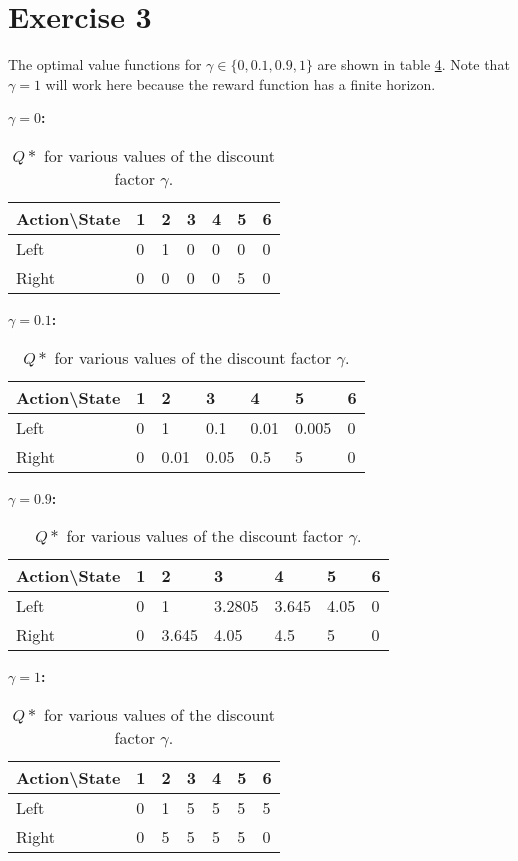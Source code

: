 \documentclass [a4paper] {report}
\begin{document}
	
	\section*{Exercise 3}
	The optimal value functions for $\gamma \in \{ 0,0.1, 0.9, 1 \}$ are shown in table \ref{optQs}.
	Note that $\gamma=1$ will work here because the reward function has a finite horizon.
	
	\begin{table}[H]
		\centering
		\caption{$Q*$ for various values of the discount factor $\gamma$.}
		\label{optQs}
		\textbf{$\gamma=0$:}
		\begin{tabular}{l|llllll}
			Action\textbackslash State    & 1 & 2 & 3 & 4 & 5 & 6 \\ \hline
			Left 				& 0 & 1 & 0 & 0 & 0 & 0 \\ 
			Right 			& 0 & 0 & 0 & 0 & 5 & 0 \\ 
		\end{tabular}
		
		\textbf{$\gamma=0.1$:}
		\begin{tabular}{l|llllll}
			Action\textbackslash State    & 1 & 2 & 3 & 4 & 5 & 6 \\ \hline
			Left 				& 0 & 1 & 0.1 & 0.01 & 0.005 & 0 \\ 
			Right 			& 0 & 0.01 & 0.05 & 0.5 & 5 & 0 \\ 
		\end{tabular}
		
		\textbf{$\gamma=0.9$:}
		\begin{tabular}{l|llllll}
			Action\textbackslash State    & 1 & 2 & 3 & 4 & 5 & 6 \\ \hline
			Left 				& 0 & 1 & 3.2805 & 3.645 & 4.05 & 0 \\ 
			Right 			& 0 & 3.645 & 4.05 & 4.5 & 5 & 0 \\ 
		\end{tabular}
		
		\textbf{$\gamma=1$:}
		\begin{tabular}{l|llllll}
			Action\textbackslash State    & 1 & 2 & 3 & 4 & 5 & 6 \\ \hline
			Left 				& 0 & 1 & 5 & 5 & 5 & 5 \\ 
			Right 			& 0 & 5 & 5 & 5 & 5 & 0 \\ 
		\end{tabular}
		
	\end{table}
\end{document}
